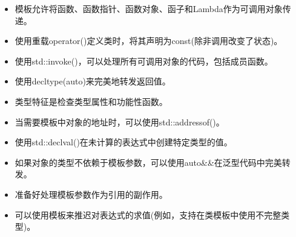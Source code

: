 
\begin{itemize}
\item 
模板允许将函数、函数指针、函数对象、函子和Lambda作为可调用对象传递。

\item 
使用重载operator()定义类时，将其声明为const(除非调用改变了状态)。

\item 
使用std::invoke()，可以处理所有可调用对象的代码，包括成员函数。

\item 
使用decltype(auto)来完美地转发返回值。

\item 
类型特征是检查类型属性和功能性函数。

\item 
当需要模板中对象的地址时，可以使用std::addressof()。

\item 
使用std::declval()在未计算的表达式中创建特定类型的值。

\item 
如果对象的类型不依赖于模板参数，可以使用auto\&\&在泛型代码中完美转发。

\item 
准备好处理模板参数作为引用的副作用。

\item 
可以使用模板来推迟对表达式的求值(例如，支持在类模板中使用不完整类型)。
\end{itemize}